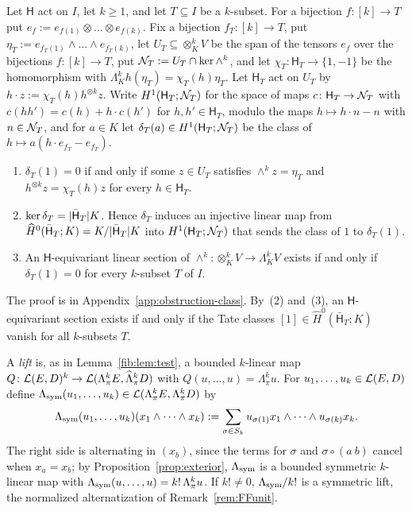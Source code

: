 \begin{proposition}\label{can:prop:tate}
Let $\mathsf H$ act on $I$, let $k\ge1$, and let $T\subseteq I$ be a $k$\nobreakdash-subset. For a bijection
$f\colon[k]\to T$ put $e_f:=e_{f(1)}\otimes\dots\otimes e_{f(k)}$. Fix a bijection $f_T\colon[k]\to T$, put
$\eta_T:=e_{f_T(1)}\wedge\dots\wedge e_{f_T(k)}$, let $U_T\subseteq\otimes^k_KV$ be the span of the tensors $e_f$ over the
bijections $f\colon[k]\to T$, put $\mathcal N_T:=U_T\cap\ker\wedge^k$, and let $\chi_T\colon\mathsf H_T\to\{1,-1\}$ be the
homomorphism with $\Lambda^k_Kh(\eta_T)=\chi_T(h)\eta_T$. Let $\mathsf H_T$ act on $U_T$ by
$h\cdot z:=\chi_T(h)h^{\otimes k}z$. Write $H^1(\mathsf H_T;\mathcal N_T)$ for the space of maps $c\colon\mathsf H_T\to\mathcal N_T$
with $c(hh')=c(h)+h\cdot c(h')$ for $h,h'\in\mathsf H_T$, modulo the maps $h\mapsto h\cdot n-n$ with $n\in\mathcal N_T$, and for
$a\in K$ let $\delta_T(a)\in H^1(\mathsf H_T;\mathcal N_T)$ be the class of $h\mapsto a(h\cdot e_{f_T}-e_{f_T})$.
\begin{enumerate}
\item $\delta_T(1)=0$ if and only if some $z\in U_T$ satisfies $\wedge^kz=\eta_T$ and $h^{\otimes k}z=\chi_T(h)z$ for
every $h\in\mathsf H_T$.
\item $\ker\delta_T=\lvert \bar{\mathsf H}_T\rvert K$. Hence $\delta_T$ induces an injective linear map from
$\widehat H^0(\bar{\mathsf H}_T;K)=K/\lvert \bar{\mathsf H}_T\rvert K$ into $H^1(\mathsf H_T;\mathcal N_T)$ that sends the class of $1$
to $\delta_T(1)$.
\item An $\mathsf H$\nobreakdash-equivariant linear section of $\wedge^k\colon\otimes^k_KV\to\Lambda^k_KV$ exists if and
only if $\delta_T(1)=0$ for every $k$\nobreakdash-subset $T$ of $I$.
\end{enumerate}
\end{proposition}

The proof is in Appendix~\ref{app:obstruction-class}. By~(2) and~(3), an $\mathsf H$\nobreakdash-equivariant section
exists if and only if the Tate classes $[1]\in\widehat H^0(\bar{\mathsf H}_T;K)$ vanish for all $k$\nobreakdash-subsets $T$.

A \emph{lift} is, as in Lemma~\ref{fib:lem:test}, a bounded $k$\nobreakdash-linear map
$Q\colon\mathcal L(E,D)^k\to\mathcal L(\Lambda^k_\pi E,\widehat\Lambda^k_\pi D)$ with $Q(u,\dots,u)=\Lambda^k_\pi u$. For
$u_1,\dots,u_k\in\mathcal L(E,D)$ define $\Lambda_{\mathrm{sym}}(u_1,\dots,u_k)\in\mathcal L(\Lambda^k_\pi E,\Lambda^k_\pi D)$ by
\begin{equation}\label{can:eq:sym}
 \Lambda_{\mathrm{sym}}(u_1,\dots,u_k)(x_1\wedge\dots\wedge x_k):=\sum_{\sigma\in S_k}u_{\sigma(1)}x_1\wedge\dots\wedge u_{\sigma(k)}x_k .
\end{equation}
The right side is alternating in $(x_b)$, since the terms for $\sigma$ and $\sigma\circ(a\ b)$ cancel when $x_a=x_b$; by
Proposition~\ref{prop:exterior}, $\Lambda_{\mathrm{sym}}$ is a bounded symmetric $k$\nobreakdash-linear map with
$\Lambda_{\mathrm{sym}}(u,\dots,u)=k!\,\Lambda^k_\pi u$. If $k!\ne0$, $\Lambda_{\mathrm{sym}}/k!$ is a symmetric lift, the normalized alternatization of
Remark~\ref{rem:FFunit}.

